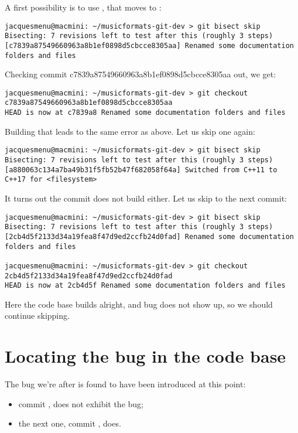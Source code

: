 A first possibility is to use , that moves to :
\begin{lstlisting}[language=Terminal]
jacquesmenu@macmini: ~/musicformats-git-dev > git bisect skip
Bisecting: 7 revisions left to test after this (roughly 3 steps)
[c7839a87549660963a8b1ef0898d5cbcce8305aa] Renamed some documentation folders and files
\end{lstlisting}

Checking commit c7839a87549660963a8b1ef0898d5cbcce8305aa out, we get:
\begin{lstlisting}[language=Terminal]
jacquesmenu@macmini: ~/musicformats-git-dev > git checkout c7839a87549660963a8b1ef0898d5cbcce8305aa
HEAD is now at c7839a8 Renamed some documentation folders and files
\end{lstlisting}

Building that leads to the same error as above. Let us skip one again:
\begin{lstlisting}[language=Terminal]
jacquesmenu@macmini: ~/musicformats-git-dev > git bisect skip
Bisecting: 7 revisions left to test after this (roughly 3 steps)
[a880063c134a7ba49b31f5fb52b47f682058f64a] Switched from C++11 to C++17 for <filesystem>
\end{lstlisting}

It turns out the commit  does not build either. Let us skip to the next commit:
\begin{lstlisting}[language=Terminal]
jacquesmenu@macmini: ~/musicformats-git-dev > git bisect skip
Bisecting: 7 revisions left to test after this (roughly 3 steps)
[2cb4d5f2133d34a19fea8f47d9ed2ccfb24d0fad] Renamed some documentation folders and files

jacquesmenu@macmini: ~/musicformats-git-dev > git checkout 2cb4d5f2133d34a19fea8f47d9ed2ccfb24d0fad
HEAD is now at 2cb4d5f Renamed some documentation folders and files
\end{lstlisting}

Here the code base builds alright, and bug does not show up, so we should continue skipping.


\section{Locating the bug in the code base}

The bug we're after is found to have been introduced at this point:
\begin{itemize}
\item commit , does not exhibit the bug;
\item the next one, commit , does.
\end{itemize}

